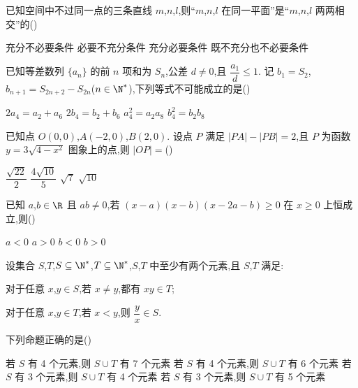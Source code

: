 \begin{problem}
已知空间中不过同一点的三条直线 \(m\),\(n\),\(l\),则``\(m\),\(n\),\(l\) 在同一平面''是``\(m\),\(n\),\(l\) 两两相交''的(\quad)

\choices
    {充分不必要条件}
    {必要不充分条件}
    {充分必要条件}
    {既不充分也不必要条件}
\end{problem}

\begin{problem}
已知等差数列 \(\{a_n\}\) 的前 \(n\) 项和为 \(S_n\),公差 \(d\neq0\),且 \(\dfrac{a_1}{d}\le1\). 记 \(b_1=S_2\),\(b_{n+1}=S_{2n+2}-S_{2n}\)(\(n\in\N^*\)),下列等式不可能成立的是(\quad)

\choices
    {\(2a_4=a_2+a_6\)}
    {\(2b_4=b_2+b_6\)}
    {\(a_4^2=a_2a_8\)}
    {\(b_4^2=b_2b_8\)}
\end{problem}

\begin{problem}
已知点 \(O(0,0)\),\(A(-2,0)\),\(B(2,0)\). 设点 \(P\) 满足 \(|PA|-|PB|=2\),且 \(P\) 为函数 \(y=3\sqrt{4-x^2}\) 图象上的点,则 \(|OP|=\)(\quad)

\choices
    {\(\dfrac{\sqrt{22}}{2}\)}
    {\(\dfrac{4\sqrt{10}}{5}\)}
    {\(\sqrt7\)}
    {\(\sqrt{10}\)}
\end{problem}

\begin{problem}
已知 \(a\),\(b\in\R\) 且 \(ab\neq0\),若 \((x-a)(x-b)(x-2a-b)\ge0\) 在 \(x\ge0\) 上恒成立,则(\quad)

\choices
    {\(a<0\)}
    {\(a>0\)}
    {\(b<0\)}
    {\(b>0\)}
\end{problem}

\begin{problem}
设集合 \(S\),\(T\),\(S\subseteq\N^*\),\(T\subseteq\N^*\),\(S\),\(T\) 中至少有两个元素,且 \(S\),\(T\) 满足:

\begin{circlelist}
\item 对于任意 \(x\),\(y\in S\),若 \(x\ne y\),都有 \(xy\in T\);

\item 对于任意 \(x\),\(y\in T\),若 \(x<y\),则 \(\dfrac{y}{x}\in S\).
\end{circlelist}

下列命题正确的是(\quad)

\choices
    {若 \(S\) 有 4 个元素,则 \(S\cup T\) 有 7 个元素}
    {若 \(S\) 有 4 个元素,则 \(S\cup T\) 有 6 个元素}
    {若 \(S\) 有 3 个元素,则 \(S\cup T\) 有 4 个元素}
    {若 \(S\) 有 3 个元素,则 \(S\cup T\) 有 5 个元素}
\end{problem}


